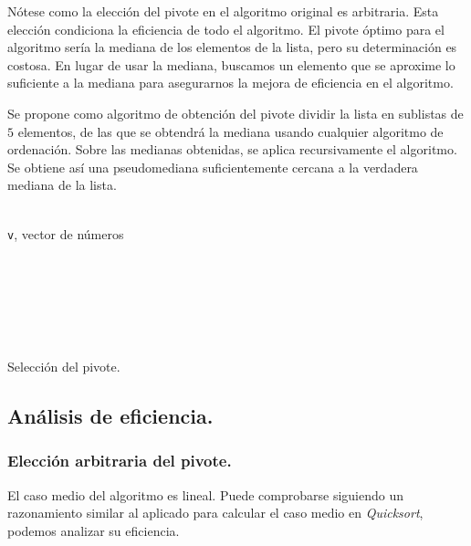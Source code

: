 \documentclass[a4paper, 11pt]{article} %
\begin{document}
    Nótese como la elección del pivote en el algoritmo original es arbitraria. Esta elección condiciona la eficiencia de
    todo el algoritmo. El pivote óptimo para el algoritmo sería la mediana de los elementos de la lista, pero su determinación
    es costosa. En lugar de usar la mediana, buscamos un elemento que se aproxime lo suficiente a la mediana para asegurarnos
    la mejora de eficiencia en el algoritmo.
    
    Se propone como algoritmo de obtención del pivote dividir la lista en sublistas de $5$ elementos, de las que se obtendrá
    la mediana usando cualquier algoritmo de ordenación. Sobre las medianas obtenidas, se aplica recursivamente el algoritmo.
    Se obtiene así una pseudomediana suficientemente cercana a la verdadera mediana de la lista.
    \begin{algorithm}[H]
      \begin{algorithmic}
	    \REQUIRE \ \\
	    \texttt{v}, vector de números \\\
	  
	     \\
	     \\
	  \ELSE
	     \\
	     \\
	  \ENDIF
      \end{algorithmic}
      \caption{Selección del pivote.}
      \label{median-of-medians}
    \end{algorithm}

  \subsection{Análisis de eficiencia.}
    \subsubsection{Elección arbitraria del pivote.}
      El caso medio del algoritmo es lineal. Puede comprobarse siguiendo un razonamiento similar al aplicado para 
      calcular el caso medio en \textit{Quicksort}, podemos analizar su eficiencia.
    
\end{document}
